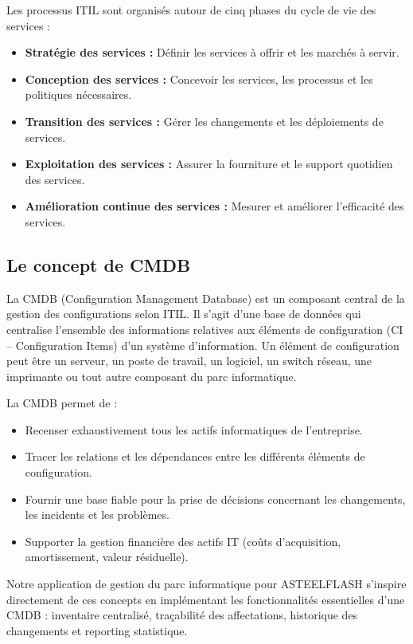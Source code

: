 Les processus ITIL sont organisés autour de cinq phases du cycle de vie des services :
\begin{itemize}[label=\textbullet,font=\normalsize]
    \item \textbf{Stratégie des services :} Définir les services à offrir et les marchés à servir.
    \item \textbf{Conception des services :} Concevoir les services, les processus et les politiques nécessaires.
    \item \textbf{Transition des services :} Gérer les changements et les déploiements de services.
    \item \textbf{Exploitation des services :} Assurer la fourniture et le support quotidien des services.
    \item \textbf{Amélioration continue des services :} Mesurer et améliorer l'efficacité des services.
\end{itemize}

\subsection{Le concept de CMDB}

La CMDB (Configuration Management Database) est un composant central de la gestion des configurations selon ITIL. Il s'agit d'une base de données qui centralise l'ensemble des informations relatives aux éléments de configuration (CI -- Configuration Items) d'un système d'information. Un élément de configuration peut être un serveur, un poste de travail, un logiciel, un switch réseau, une imprimante ou tout autre composant du parc informatique.

La CMDB permet de :
\begin{itemize}[label=\textbullet,font=\normalsize]
    \item Recenser exhaustivement tous les actifs informatiques de l'entreprise.
    \item Tracer les relations et les dépendances entre les différents éléments de configuration.
    \item Fournir une base fiable pour la prise de décisions concernant les changements, les incidents et les problèmes.
    \item Supporter la gestion financière des actifs IT (coûts d'acquisition, amortissement, valeur résiduelle).
\end{itemize}

Notre application de gestion du parc informatique pour ASTEELFLASH s'inspire directement de ces concepts en implémentant les fonctionnalités essentielles d'une CMDB : inventaire centralisé, traçabilité des affectations, historique des changements et reporting statistique.

